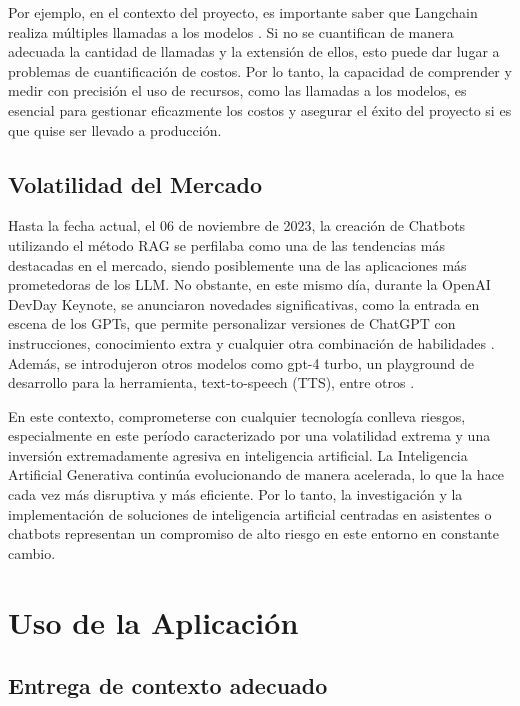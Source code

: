 Por ejemplo, en el contexto del proyecto, es importante saber que Langchain realiza múltiples llamadas a los modelos \cite{framework1}. Si no se cuantifican de manera adecuada 
la cantidad de llamadas y la extensión de ellos, esto puede dar lugar a problemas de cuantificación de costos. Por lo tanto, la capacidad de comprender y 
medir con precisión el uso de recursos, como las llamadas a los modelos, es esencial para gestionar eficazmente los costos y asegurar el éxito del proyecto 
si es que quise ser llevado a producción.


\subsection{Volatilidad del Mercado}

Hasta la fecha actual, el 06 de noviembre de 2023, la creación de Chatbots utilizando el método RAG se perfilaba como 
una de las tendencias más destacadas en el mercado, siendo posiblemente una de las aplicaciones más prometedoras de los LLM. 
No obstante, en este mismo día, durante la OpenAI DevDay Keynote, se anunciaron novedades significativas, como la entrada en 
escena de los GPTs, que permite personalizar versiones de ChatGPT con instrucciones, conocimiento extra y cualquier otra combinación 
de habilidades \cite{openai2}. Además, se introdujeron otros modelos como gpt-4 turbo, un playground de desarrollo para la herramienta, 
text-to-speech (TTS), entre otros \cite{openai3}.

En este contexto, comprometerse con cualquier tecnología conlleva riesgos, especialmente en este período caracterizado por una 
volatilidad extrema y una inversión extremadamente agresiva en inteligencia artificial. La Inteligencia Artificial Generativa 
continúa evolucionando de manera acelerada, lo que la hace cada vez más disruptiva y más eficiente. Por lo tanto, la investigación 
y la implementación de soluciones de inteligencia artificial centradas en asistentes o chatbots representan un compromiso de alto 
riesgo en este entorno en constante cambio.

\section{Uso de la Aplicación}

\subsection{Entrega de contexto adecuado}

